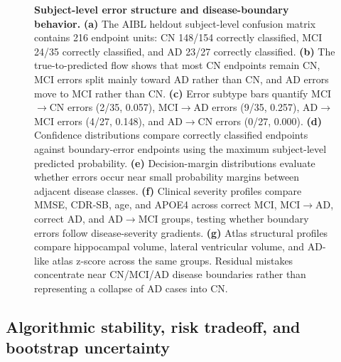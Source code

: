 \documentclass[12pt,a4paper]{article}
\begin{document}
\begin{figure}[p]
    \centering
    \caption{\textbf{Subject-level error structure and disease-boundary behavior.} \textbf{(a)} The AIBL heldout subject-level confusion matrix contains 216 endpoint units: CN 148/154 correctly classified, MCI 24/35 correctly classified, and AD 23/27 correctly classified. \textbf{(b)} The true-to-predicted flow shows that most CN endpoints remain CN, MCI errors split mainly toward AD rather than CN, and AD errors move to MCI rather than CN. \textbf{(c)} Error subtype bars quantify MCI$\rightarrow$CN errors (2/35, 0.057), MCI$\rightarrow$AD errors (9/35, 0.257), AD$\rightarrow$MCI errors (4/27, 0.148), and AD$\rightarrow$CN errors (0/27, 0.000). \textbf{(d)} Confidence distributions compare correctly classified endpoints against boundary-error endpoints using the maximum subject-level predicted probability. \textbf{(e)} Decision-margin distributions evaluate whether errors occur near small probability margins between adjacent disease classes. \textbf{(f)} Clinical severity profiles compare MMSE, CDR-SB, age, and APOE4 across correct MCI, MCI$\rightarrow$AD, correct AD, and AD$\rightarrow$MCI groups, testing whether boundary errors follow disease-severity gradients. \textbf{(g)} Atlas structural profiles compare hippocampal volume, lateral ventricular volume, and AD-like atlas z-score across the same groups. Residual mistakes concentrate near CN/MCI/AD disease boundaries rather than representing a collapse of AD cases into CN.}
    \label{fig:v6_error}
\end{figure}

\subsection{Algorithmic stability, risk tradeoff, and bootstrap uncertainty}
\label{sec:stability}
\end{document}
